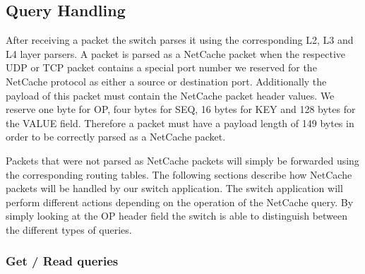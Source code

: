 \documentclass[11pt,oneside,a4paper]{article}
\begin{document}
\subsection{Query Handling}

After receiving a packet the switch parses it using the corresponding L2, L3 and L4 layer parsers.
A packet is parsed as a NetCache packet when the respective UDP or TCP packet contains a special port number we reserved for the NetCache protocol as either a source or destination port.
Additionally the payload of this packet must contain the NetCache packet header values.
We reserve one byte for OP, four bytes for SEQ, 16 bytes for KEY and 128 bytes for the VALUE field.
Therefore a packet must have a payload length of 149 bytes in order to be correctly parsed as a NetCache packet.

Packets that were not parsed as NetCache packets will simply be forwarded using the corresponding routing tables.
The following sections describe how NetCache packets will be handled by our switch application.
The switch application will perform different actions depending on the operation of the NetCache query.
By simply looking at the OP header field the switch is able to distinguish between the different types of queries.

\subsubsection{Get / Read queries}
\end{document}
